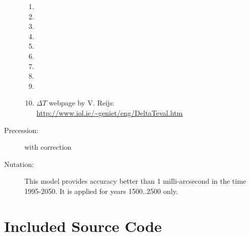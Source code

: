 \begin{description}
\begin{enumerate}
		\item {}%
		\item {} %
		\item {} %
		\item {} %
		\item {} %
		\item {}  %
		\item {} %
		\item {} %
		\item {} %
		\item $\Delta T$ webpage by V. Reijs: \url{http://www.iol.ie/~geniet/eng/DeltaTeval.htm}
		\end{enumerate}
	\item[Precession:]  with correction \citep{2012AA:Vondrak} 
	\item[Nutation:]    %
		This model provides accuracy better than 1 milli-arcsecond in the
		time 1995-2050. It is applied for years 1500..2500 only.
\end{description}		
		
\section{Included Source Code}
\label{sec:ack:code}

